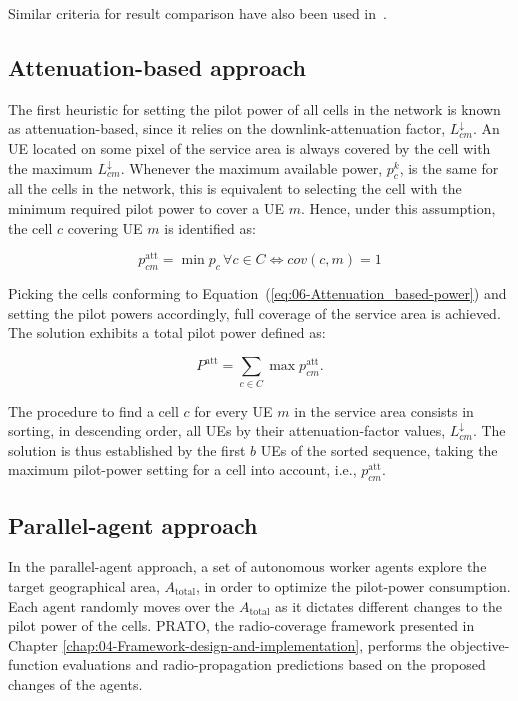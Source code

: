 Similar criteria for result comparison have also been used in~\cite{Siomina_Pilot.power.optimization:2004,Siomina:Minimum.pilot.power.for.service.coverage}.


\subsection{Attenuation-based approach}

The first heuristic for setting the pilot power of all cells in the
network is known as attenuation-based, since it relies on the downlink-attenuation
factor, $L_{cm}^{\downarrow}$. An UE located on some pixel of the
service area is always covered by the cell with the maximum $L_{cm}^{\downarrow}$.
Whenever the maximum available power, $p_{c}^{k}$, is the same for
all the cells in the network, this is equivalent to selecting the
cell with the minimum required pilot power to cover a UE $m$. Hence,
under this assumption, the cell $c$ covering UE $m$ is identified
as:

\begin{equation}
p_{cm}^{\mathrm{att}}=\min p_{c}\,\forall c\in C\iff cov(c,m)=1\label{eq:06-Attenuation_based-power}
\end{equation}


Picking the cells conforming to Equation~(\ref{eq:06-Attenuation_based-power})
and setting the pilot powers accordingly, full coverage of the service
area is achieved. The solution exhibits a total pilot power defined
as:

\begin{equation}
P^{\mathrm{att}}=\sum_{c\in C}\max p_{cm}^{\mathrm{att}}.
\end{equation}


The procedure to find a cell $c$ for every UE $m$ in the service
area consists in sorting, in descending order, all UEs by their attenuation-factor
values, $L_{cm}^{\downarrow}$. The solution is thus established by
the first $b$ UEs of the sorted sequence, taking the maximum pilot-power
setting for a cell into account, i.e., $p_{cm}^{\mathrm{att}}$.


\subsection{Parallel-agent approach \label{sub:06-Parallel_agent_approach}}

In the parallel-agent approach, a set of autonomous worker agents
explore the target geographical area, $A_{\mathrm{total}}$, in order
to optimize the pilot-power consumption. Each agent randomly moves
over the $A_{\mathrm{total}}$ as it dictates different changes to
the pilot power of the cells. PRATO, the radio-coverage framework
presented in Chapter \ref{chap:04-Framework-design-and-implementation},
performs the objective-function evaluations and radio-propagation
predictions based on the proposed changes of the agents.

